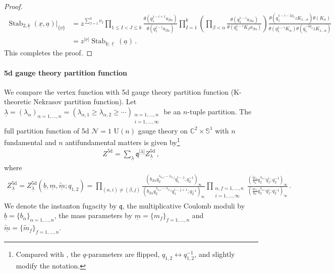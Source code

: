 \begin{proof}
\begin{align}
    \operatorname{Stab}_{2,\underline{k}}(\underline{x},\underline{a})\Big|_{\{\underline{\nu}\}} & = z^{\sum_{I=1}^k \nu_I} \prod_{1 \le I < J \le k} \frac{\theta(q_1^{j-i+1} a_{\beta\alpha})}{\theta(q_1^{j-i} a_{\beta\alpha})} \prod_{I=1}^k 
    \left(
    \prod_{\beta < \alpha} \frac{\theta(q_1^{1-i} a_{\beta\alpha})}{\theta(q_1^{1-i} K_\beta a_{\beta\alpha})}
    \right)
    \frac{\theta(q_1^{1-i-2\rho_I} z K_{1\ldots \alpha}) \theta(K_{\alpha})}{\theta(q_1^{1-i} K_{\alpha}) \theta(q_1^{-2\rho_I} z K_{1\ldots \alpha})}
    \nonumber \\
    & = z^{|\underline{\nu}|} \operatorname{Stab}_{\underline{k};\underline{\ell}}(\underline{a})
    \, .
\end{align}
This completes the proof.
\end{proof}

\paragraph{5d gauge theory partition function}

We compare the vertex function with 5d gauge theory partition function (K-theoretic Nekrasov partition function).
Let $\underline{\lambda} = (\lambda_\alpha)_{\alpha=1,\ldots,n} = (\lambda_{\alpha,1} \ge \lambda_{\alpha,2} \ge \cdots )_{\substack{\alpha=1,\ldots,n \\ i = 1,\ldots, \infty}}$ be an $n$-tuple partition.
The full partition function of 5d $\mathcal{N}=1$ $\mathrm{U}(n)$ gauge theory on $\mathbb{C}^2 \times \mathbb{S}^1$ with $n$ fundamental and $n$ antifundamental matters is given by\footnote{Compared with \cite{Kimura:2015rgi,Kimura:2020jxl}, the $q$-parameters are flipped, $q_{1,2} \leftrightarrow q_{1,2}^{-1}$, and slightly modify the notation.
}
\begin{align}
    Z^\text{5d} = \sum_{\underline{\lambda}} \mathfrak{q}^{|\underline{\lambda}|} Z^\text{5d}_{\underline{\lambda}}
    \, ,
\end{align}
where
\begin{align}
    Z^\text{5d}_{\underline{\lambda}} = Z^\text{5d}_{\underline{\lambda}}(\underline{b},\underline{m},\underline{\widetilde{m}};q_{1,2}) = \prod_{(\alpha,i) \neq (\beta, j)} \frac{(b_{\beta\alpha} q_2^{\lambda_{\alpha,i} - \lambda_{\beta,j}} q_1^{i-j}; q_2^{-1})_\infty}{(b_{\beta\alpha} q_2^{\lambda_{\alpha,i} - \lambda_{\beta,j}} q_1^{i-j+1}; q_2^{-1})_\infty} 
    \prod_{\substack{\alpha, f=1,\ldots,n \\ i = 1,\ldots,\infty}} \frac{(\frac{\widetilde{m}_f}{b_\alpha} q_2^{\lambda_{\alpha,i}} q_1^{i};q_2^{-1})_\infty}{(\frac{m_f}{b_\alpha} q_2^{\lambda_{\alpha,i}} q_1^{i};q_2^{-1})_\infty} \, .
\end{align}
We denote the instanton fugacity by $\mathfrak{q}$, the multiplicative Coulomb moduli by $\underline{b} = \{ b_\alpha \}_{\alpha = 1,\ldots,n}$, the mass parameters by $\underline{m} = \{ m_f \}_{f=1,\ldots,n}$ and $\underline{\widetilde{m}} = \{ \widetilde{m}_f \}_{f=1,\ldots,n}$.



